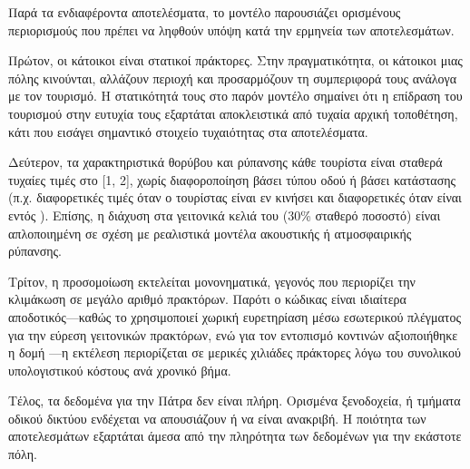 Παρά τα ενδιαφέροντα αποτελέσματα, το μοντέλο παρουσιάζει ορισμένους
περιορισμούς που πρέπει να ληφθούν υπόψη κατά την ερμηνεία των
αποτελεσμάτων.

Πρώτον, οι κάτοικοι είναι στατικοί πράκτορες. Στην πραγματικότητα,
οι κάτοικοι μιας πόλης κινούνται, αλλάζουν περιοχή και προσαρμόζουν
τη συμπεριφορά τους ανάλογα με τον τουρισμό. Η στατικότητά τους στο
παρόν μοντέλο σημαίνει ότι η επίδραση του τουρισμού στην ευτυχία τους
εξαρτάται αποκλειστικά από τυχαία αρχική τοποθέτηση, κάτι που εισάγει
σημαντικό στοιχείο τυχαιότητας στα αποτελέσματα.

Δεύτερον, τα χαρακτηριστικά θορύβου και ρύπανσης κάθε τουρίστα είναι
σταθερά τυχαίες τιμές στο [1, 2], χωρίς διαφοροποίηση βάσει τύπου οδού
ή βάσει κατάστασης (π.χ. διαφορετικές τιμές όταν ο τουρίστας είναι εν κινήσει
και διαφορετικές όταν είναι εντός ). Επίσης, η διάχυση στα γειτονικά
κελιά του  (30\% σταθερό ποσοστό) είναι απλοποιημένη σε σχέση με
ρεαλιστικά μοντέλα ακουστικής ή ατμοσφαιρικής ρύπανσης.

Τρίτον, η προσομοίωση εκτελείται μονονηματικά, γεγονός που περιορίζει την
κλιμάκωση σε μεγάλο αριθμό πρακτόρων. Παρότι ο κώδικας είναι ιδιαίτερα
αποδοτικός—καθώς το  χρησιμοποιεί χωρική ευρετηρίαση
 μέσω εσωτερικού πλέγματος  για
την εύρεση γειτονικών πρακτόρων, ενώ για τον εντοπισμό κοντινών 
αξιοποιήθηκε η δομή —η εκτέλεση περιορίζεται σε μερικές χιλιάδες
πράκτορες λόγω του συνολικού υπολογιστικού κόστους ανά χρονικό βήμα.

Τέλος, τα δεδομένα  για την Πάτρα δεν είναι πλήρη. Ορισμένα
ξενοδοχεία,  ή τμήματα οδικού δικτύου ενδέχεται να απουσιάζουν
ή να είναι ανακριβή. Η ποιότητα των αποτελεσμάτων εξαρτάται άμεσα από
την πληρότητα των δεδομένων  για την εκάστοτε πόλη.